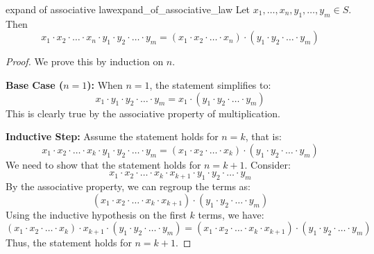 \documentclass[11pt,lang=en]{elegantbook}
\begin{document}
\begin{proposition}{expand of associative law}{expand_of_associative_law}
  Let $x_1, \ldots, x_n, y_1, \ldots, y_m \in S$. Then
  \[
  x_1 \cdot x_2 \cdot \ldots \cdot x_n \cdot y_1 \cdot y_2 \cdot \ldots \cdot y_m = (x_1 \cdot x_2 \cdot \ldots \cdot x_n) \cdot (y_1 \cdot y_2 \cdot \ldots \cdot y_m)
  \]
\end{proposition}
\begin{proof}
We prove this by induction on $n$.

\textbf{Base Case ($n = 1$):}  
When $n = 1$, the statement simplifies to:
\[
x_1 \cdot y_1 \cdot y_2 \cdot \ldots \cdot y_m = x_1 \cdot (y_1 \cdot y_2 \cdot \ldots \cdot y_m)
\]
This is clearly true by the associative property of multiplication.

\textbf{Inductive Step:}  
Assume the statement holds for $n = k$, that is:
\[
x_1 \cdot x_2 \cdot \ldots \cdot x_k \cdot y_1 \cdot y_2 \cdot \ldots \cdot y_m = (x_1 \cdot x_2 \cdot \ldots \cdot x_k) \cdot (y_1 \cdot y_2 \cdot \ldots \cdot y_m)
\]
We need to show that the statement holds for $n = k + 1$. Consider:
\[
x_1 \cdot x_2 \cdot \ldots \cdot x_k \cdot x_{k+1} \cdot y_1 \cdot y_2 \cdot \ldots \cdot y_m
\]
By the associative property, we can regroup the terms as:
\[
(x_1 \cdot x_2 \cdot \ldots \cdot x_k \cdot x_{k+1}) \cdot (y_1 \cdot y_2 \cdot \ldots \cdot y_m)
\]
Using the inductive hypothesis on the first $k$ terms, we have:
\[
(x_1 \cdot x_2 \cdot \ldots \cdot x_k) \cdot x_{k+1} \cdot (y_1 \cdot y_2 \cdot \ldots \cdot y_m) = (x_1 \cdot x_2 \cdot \ldots \cdot x_k \cdot x_{k+1}) \cdot (y_1 \cdot y_2 \cdot \ldots \cdot y_m)
\]
Thus, the statement holds for $n = k + 1$.

\end{proof}
\end{document}
